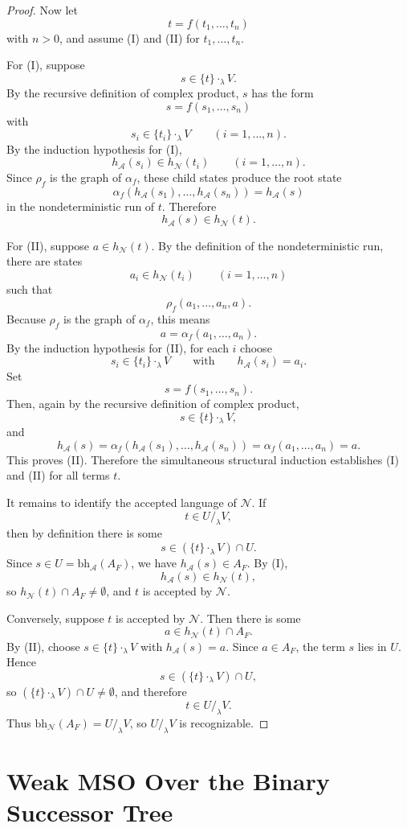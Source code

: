 \documentclass[11pt]{article}
\theoremstyle{definition}
\newcommand{\Aut}{\mathcal A}
\newcommand{\bh}{\mathrm{bh}}
\begin{document}
\begin{proof}
Now let
\[
  t=f(t_1,\ldots,t_n)
\]
with \(n>0\), and assume (I) and (II) for \(t_1,\ldots,t_n\).

For (I), suppose
\[
  s\in\{t\}\cdot_\lambda V.
\]
By the recursive definition of complex product, \(s\) has the form
\[
  s=f(s_1,\ldots,s_n)
\]
with
\[
  s_i\in\{t_i\}\cdot_\lambda V
  \qquad (i=1,\ldots,n).
\]
By the induction hypothesis for (I),
\[
  h_\Aut(s_i)\in h_{\mathcal N}(t_i)
  \qquad (i=1,\ldots,n).
\]
Since \(\rho_f\) is the graph of \(\alpha_f\), these child states produce the
root state
\[
  \alpha_f(h_\Aut(s_1),\ldots,h_\Aut(s_n))
  =
  h_\Aut(s)
\]
in the nondeterministic run of \(t\).  Therefore
\[
  h_\Aut(s)\in h_{\mathcal N}(t).
\]

For (II), suppose \(a\in h_{\mathcal N}(t)\).  By the definition of the
nondeterministic run, there are states
\[
  a_i\in h_{\mathcal N}(t_i)
  \qquad (i=1,\ldots,n)
\]
such that
\[
  \rho_f(a_1,\ldots,a_n,a).
\]
Because \(\rho_f\) is the graph of \(\alpha_f\), this means
\[
  a=\alpha_f(a_1,\ldots,a_n).
\]
By the induction hypothesis for (II), for each \(i\) choose
\[
  s_i\in\{t_i\}\cdot_\lambda V
  \qquad\text{with}\qquad
  h_\Aut(s_i)=a_i.
\]
Set
\[
  s=f(s_1,\ldots,s_n).
\]
Then, again by the recursive definition of complex product,
\[
  s\in\{t\}\cdot_\lambda V,
\]
and
\[
  h_\Aut(s)
  =
  \alpha_f(h_\Aut(s_1),\ldots,h_\Aut(s_n))
  =
  \alpha_f(a_1,\ldots,a_n)
  =
  a.
\]
This proves (II).
Therefore the simultaneous structural induction establishes (I) and (II) for
all terms \(t\).

It remains to identify the accepted language of \(\mathcal N\).  If
\[
  t\in U/_{\lambda}V,
\]
then by definition there is some
\[
  s\in(\{t\}\cdot_\lambda V)\cap U.
\]
Since \(s\in U=\bh_\Aut(A_F)\), we have \(h_\Aut(s)\in A_F\).  By (I),
\[
  h_\Aut(s)\in h_{\mathcal N}(t),
\]
so \(h_{\mathcal N}(t)\cap A_F\neq\emptyset\), and \(t\) is accepted by
\(\mathcal N\).

Conversely, suppose \(t\) is accepted by \(\mathcal N\).  Then there is some
\[
  a\in h_{\mathcal N}(t)\cap A_F.
\]
By (II), choose \(s\in\{t\}\cdot_\lambda V\) with \(h_\Aut(s)=a\).  Since
\(a\in A_F\), the term \(s\) lies in \(U\).  Hence
\[
  s\in(\{t\}\cdot_\lambda V)\cap U,
\]
so \((\{t\}\cdot_\lambda V)\cap U\neq\emptyset\), and therefore
\[
  t\in U/_{\lambda}V.
\]
Thus \(\bh_{\mathcal N}(A_F)=U/_{\lambda}V\), so \(U/_{\lambda}V\) is
recognizable.
\end{proof}

\section{Weak MSO Over the Binary Successor Tree}
\end{document}
